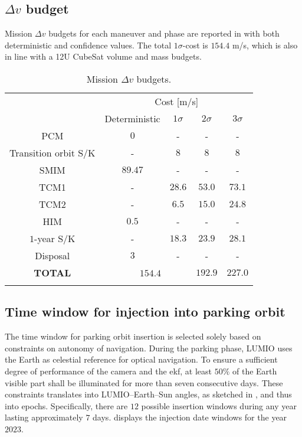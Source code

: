 \subsection{$\Delta v$ budget}
\label{subsec:deltavbudget}
Mission $\Delta v$ budgets for each maneuver and phase are reported in  with both deterministic and confidence values. The total $1\sigma$-cost is $154.4$ m/s, which is also in line with a 12U CubeSat volume and mass  budgets.
%
\begin{table}[!h]
	\caption{Mission $\Delta v$ budgets.}
	\label{tab:MissiondvBudgets}
	\centering
	\begin{tabular}{ccc|cc}
		\TOPlines
		\multirow{2}{*}{Maneuver} & \multicolumn{4}{c}{Cost [m/s]} \\
		& Deterministic & $1\sigma$ & $2\sigma$ & $3\sigma$ \\
		\MIDline
		PCM               & $0$  & - & - & - \\
		Transition orbit S/K & - & $8$ & $8$ & $8$ \\
		SMIM              & $89.47$ & - & - & - \\
		TCM1              & - & $28.6$ & $53.0$ & $73.1$ \\
		TCM2              & - & $6.5$ & $15.0$ & $24.8$ \\
		HIM               & $0.5$ & - & - & - \\
		$1$-year S/K & - & $18.3$ & $23.9$ & $28.1$ \\
		Disposal          & $3$ & - & - & - \\
		\MIDline
		\textbf{TOTAL} & \multicolumn{2}{c}{\ \ $154.4$} & $192.9$ & $227.0$ \\
		\BOTTOMlines
	\end{tabular}
\end{table}
%

\subsection{Time window for injection into parking orbit}\label{subsec:Time window for injection into parking orbit}
The time window for parking orbit insertion is selected solely based on constraints on autonomy of navigation. During the parking phase, LUMIO uses the Earth as celestial reference for optical navigation. To ensure a sufficient degree of performance of the camera and the {ekf}, at least $50\%$ of the Earth visible part shall be illuminated for more than seven consecutive days. These constraints translates into LUMIO--Earth--Sun angles, as sketched in , and thus into epochs. Specifically, there are $12$ possible insertion windows during any year lasting approximately $7$ days.  displays the injection date windows for the year $2023$.

